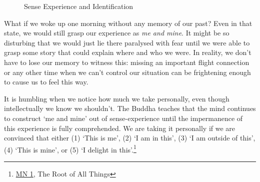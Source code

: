\begin{figure}[h]
\caption{Sense Experience and Identification}\label{fig-senses-identification}
\bigskip
\hspace*{-23mm}%
%
\end{figure}

\vfill\null
\clearpage

What if we woke up one morning without any memory of our past? Even in
that state, we would still grasp our experience as \emph{me and mine}.
It might be so disturbing that we would just lie there paralysed with
fear until we were able to grasp some story that could explain where and
who we were. In reality, we don't have to lose our memory to witness
this: missing an important flight connection or any other time when we
can't control our situation can be frightening enough to cause us to
feel this way.

It is humbling when we notice how much we take personally, even though
intellectually we know we shouldn't. The Buddha teaches that the mind
continues to construct `me and mine' out of sense-experience until the
impermanence of this experience is fully comprehended. We are taking it
personally if we are convinced that either (1) `This is me', (2) `I am
in this', (3) `I am outside of this', (4) `This is mine', or (5) `I
delight in this'.\footnote{\href{https://suttacentral.net/mn1/en/bodhi}{MN
  1}, The Root of All Things}

